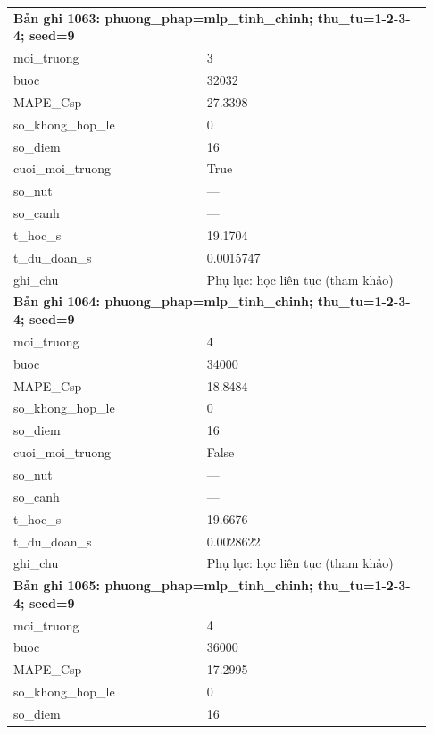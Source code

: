 \begin{longtable}{p{0.43\linewidth}p{0.50\linewidth}}
\midrule
\multicolumn{2}{p{0.95\linewidth}}{\textbf{Bản ghi 1063: phuong\_phap=mlp\_tinh\_chinh; thu\_tu=1-2-3-4; seed=9}} \\
moi\_\allowbreak truong & 3 \\
buoc & 32032 \\
MAPE\_\allowbreak Csp & 27.3398 \\
so\_\allowbreak khong\_\allowbreak hop\_\allowbreak le & 0 \\
so\_\allowbreak diem & 16 \\
cuoi\_\allowbreak moi\_\allowbreak truong & True \\
so\_\allowbreak nut & — \\
so\_\allowbreak canh & — \\
t\_\allowbreak hoc\_\allowbreak s & 19.1704 \\
t\_\allowbreak du\_\allowbreak doan\_\allowbreak s & 0.0015747 \\
ghi\_\allowbreak chu & Phụ lục: học liên tục (tham khảo) \\
\midrule
\multicolumn{2}{p{0.95\linewidth}}{\textbf{Bản ghi 1064: phuong\_phap=mlp\_tinh\_chinh; thu\_tu=1-2-3-4; seed=9}} \\
moi\_\allowbreak truong & 4 \\
buoc & 34000 \\
MAPE\_\allowbreak Csp & 18.8484 \\
so\_\allowbreak khong\_\allowbreak hop\_\allowbreak le & 0 \\
so\_\allowbreak diem & 16 \\
cuoi\_\allowbreak moi\_\allowbreak truong & False \\
so\_\allowbreak nut & — \\
so\_\allowbreak canh & — \\
t\_\allowbreak hoc\_\allowbreak s & 19.6676 \\
t\_\allowbreak du\_\allowbreak doan\_\allowbreak s & 0.0028622 \\
ghi\_\allowbreak chu & Phụ lục: học liên tục (tham khảo) \\
\midrule
\multicolumn{2}{p{0.95\linewidth}}{\textbf{Bản ghi 1065: phuong\_phap=mlp\_tinh\_chinh; thu\_tu=1-2-3-4; seed=9}} \\
moi\_\allowbreak truong & 4 \\
buoc & 36000 \\
MAPE\_\allowbreak Csp & 17.2995 \\
so\_\allowbreak khong\_\allowbreak hop\_\allowbreak le & 0 \\
so\_\allowbreak diem & 16 \\

\end{longtable}
